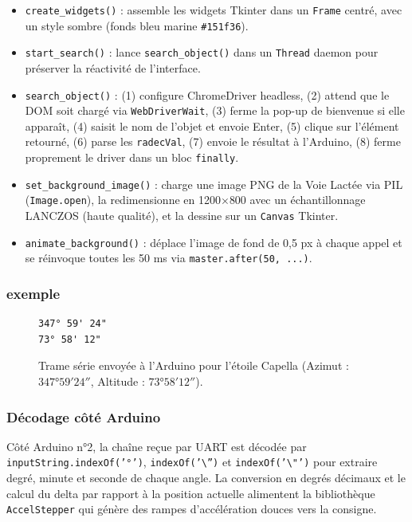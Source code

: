 \documentclass[12pt,a4paper]{report}
\begin{document}
\begin{enumerate}
\begin{itemize}
    \item \texttt{create\_widgets()} : assemble les widgets Tkinter dans un \texttt{Frame} centré, avec un style sombre (fonds bleu marine \texttt{\#151f36}).
    \item \texttt{start\_search()} : lance \texttt{search\_object()} dans un \texttt{Thread} daemon pour préserver la réactivité de l'interface.
    \item \texttt{search\_object()} : (1) configure ChromeDriver headless, (2) attend que le DOM soit chargé via \texttt{WebDriverWait}, (3) ferme la pop-up de bienvenue si elle apparaît, (4) saisit le nom de l'objet et envoie Enter, (5) clique sur l'élément retourné, (6) parse les \texttt{radecVal}, (7) envoie le résultat à l'Arduino, (8) ferme proprement le driver dans un bloc \texttt{finally}.
    \item \texttt{set\_background\_image()} : charge une image PNG de la Voie Lactée via PIL (\texttt{Image.open}), la redimensionne en 1200$\times$800 avec un échantillonnage LANCZOS (haute qualité), et la dessine sur un \texttt{Canvas} Tkinter.
    \item \texttt{animate\_background()} : déplace l'image de fond de 0,5 px à chaque appel et se réinvoque toutes les 50 ms via \texttt{master.after(50, ...)}.
\end{itemize}
\subsubsection{exemple}
\begin{figure}[H]
    \centering
    \begin{tcolorbox}[
        colback=black,
        colframe=gray,
        width=0.5\textwidth,
        arc=4pt,
        title={\texttt{/dev/ttyUSB0 — 115200 baud}},
        fonttitle=\small\color{white},
        coltitle=white,
        colbacktitle=gray!50!black
    ]
    {\color{white}\begin{verbatim}
347° 59' 24"
73° 58' 12"
    \end{verbatim}}
    \end{tcolorbox}
    \caption{Trame série envoyée à l'Arduino pour l'étoile Capella 
    (Azimut : $347°59'24''$, Altitude : $73°58'12''$).}
    \label{fig:trame_serie}
\end{figure}
\subsubsection{Décodage côté Arduino}
Côté Arduino n°2, la chaîne reçue par UART est décodée par \texttt{inputString.indexOf('°')}, \texttt{indexOf('\textbackslash{}'')} et \texttt{indexOf('\textbackslash{}"')} pour extraire degré, minute et seconde de chaque angle. La conversion en degrés décimaux et le calcul du delta par rapport à la position actuelle alimentent la bibliothèque \texttt{AccelStepper} qui génère des rampes d'accélération douces vers la consigne.


\end{enumerate}
\end{document}
